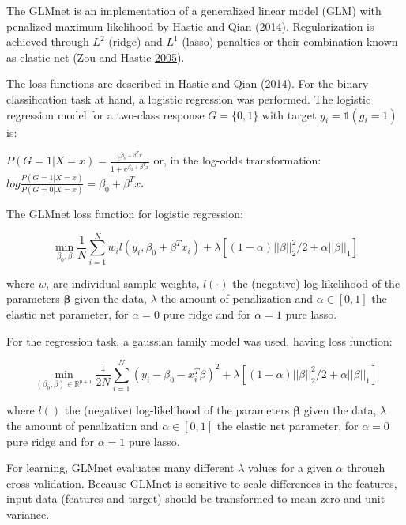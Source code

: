 \documentclass[
  11pt,
  a4paper,
  DIV=12,captions=tableheading,oneside,titlepage]{scrbook}
\begin{document}
The GLMnet is an implementation of a generalized linear model (GLM) with penalized maximum likelihood by Hastie and Qian (\protect\hyperlink{ref-hastie2014glmnet}{2014}). Regularization is achieved through \(L^2\) (ridge) and \(L^1\) (lasso) penalties or their combination known as elastic net (Zou and Hastie \protect\hyperlink{ref-zou2005regularization}{2005}).

The loss functions are described in Hastie and Qian (\protect\hyperlink{ref-hastie2014glmnet}{2014}). For the binary classification task at hand, a logistic regression was performed. The logistic regression model for a two-class response \(G = \{0,1\}\) with target \(y_i = \mathbb{1}(g_i=1)\) is:

\(P(G=1|X=x) = \frac{e^{\beta_0+\beta^Tx}}{1+e^{\beta_0+\beta^Tx}}\) or, in the log-odds transformation: \(log\frac{P(G=1|X=x)}{P(G=0|X=x)}=\beta_0+\beta^Tx\).

The GLMnet loss function for logistic regression:

\begin{equation}
\min_{\beta_0,\beta} \frac{1}{N} \sum_{i=1}^{N} w_i l(y_i,\beta_0+\beta^T x_i) + \lambda\left[(1-\alpha)||\beta||_2^2/2 + \alpha ||\beta||_1\right]
\label{eq:glmnet-logit}
\end{equation}

where \(w_i\) are individual sample weights, \(l(\cdot)\) the (negative) log-likelihood of the parameters \(\mathbf{\beta}\) given the data, \(\lambda\) the amount of penalization and \(\alpha \in [0,1]\) the elastic net parameter, for \(\alpha=0\) pure ridge and for \(\alpha=1\) pure lasso.

For the regression task, a gaussian family model was used, having loss function:

\begin{equation}
\min_{(\beta_0, \beta) \in \mathbb{R}^{p+1}}\frac{1}{2N} \sum_{i=1}^N (y_i -\beta_0-x_i^T \beta)^2+\lambda \left[ (1-\alpha)||\beta||_2^2/2 + \alpha||\beta||_1\right]
\label{eq:glmnet-gaussian}
\end{equation}

where \(l()\) the (negative) log-likelihood of the parameters \(\mathbf{\beta}\) given the data, \(\lambda\) the amount of penalization and \(\alpha \in [0,1]\) the elastic net parameter, for \(\alpha=0\) pure ridge and for \(\alpha=1\) pure lasso.

For learning, GLMnet evaluates many different \(\lambda\) values for a given \(\alpha\) through cross validation. Because GLMnet is sensitive to scale differences in the features, input data (features and target) should be transformed to mean zero and unit variance.
\end{document}
